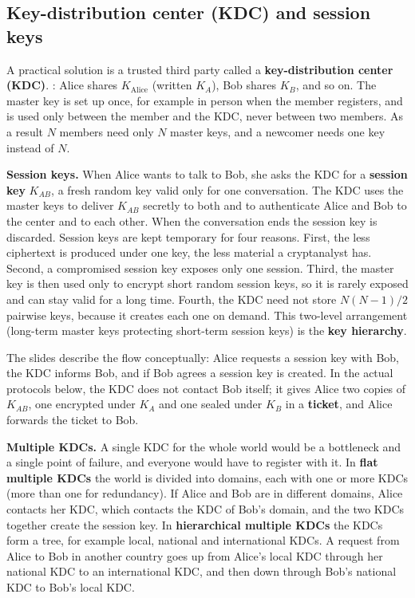 \subsection{Key-distribution center (KDC) and session keys \new}

A practical solution is a trusted third party called a \textbf{key-distribution center (KDC)}. : Alice shares $K_{\text{Alice}}$ (written $K_A$), Bob shares $K_B$, and so on. The master key is set up once, for example in person when the member registers, and is used only between the member and the KDC, never between two members. As a result $N$ members need only $N$ master keys, and a newcomer needs one key instead of $N$.

\textbf{Session keys.} When Alice wants to talk to Bob, she asks the KDC for a \textbf{session key} $K_{AB}$, a fresh random key valid only for one conversation. The KDC uses the master keys to deliver $K_{AB}$ secretly to both and to authenticate Alice and Bob to the center and to each other. When the conversation ends the session key is discarded. Session keys are kept temporary for four reasons. First, the less ciphertext is produced under one key, the less material a cryptanalyst has. Second, a compromised session key exposes only one session. Third, the master key is then used only to encrypt short random session keys, so it is rarely exposed and can stay valid for a long time. Fourth, the KDC need not store $N(N-1)/2$ pairwise keys, because it creates each one on demand. This two-level arrangement (long-term master keys protecting short-term session keys) is the \textbf{key hierarchy}.

The slides describe the flow conceptually: Alice requests a session key with Bob, the KDC informs Bob, and if Bob agrees a session key is created. In the actual protocols below, the KDC does not contact Bob itself; it gives Alice two copies of $K_{AB}$, one encrypted under $K_A$ and one sealed under $K_B$ in a \textbf{ticket}, and Alice forwards the ticket to Bob.

\textbf{Multiple KDCs.} A single KDC for the whole world would be a bottleneck and a single point of failure, and everyone would have to register with it. In \textbf{flat multiple KDCs} the world is divided into domains, each with one or more KDCs (more than one for redundancy). If Alice and Bob are in different domains, Alice contacts her KDC, which contacts the KDC of Bob's domain, and the two KDCs together create the session key. In \textbf{hierarchical multiple KDCs} the KDCs form a tree, for example local, national and international KDCs. A request from Alice to Bob in another country goes up from Alice's local KDC through her national KDC to an international KDC, and then down through Bob's national KDC to Bob's local KDC.

